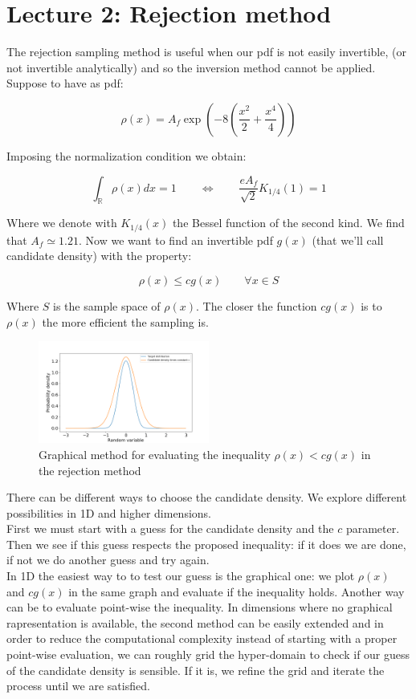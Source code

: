 \chapter*{Lecture 2: Rejection method}

The rejection sampling method is useful when our pdf is not easily invertible, (or not invertible analytically) and so the inversion method cannot be applied. \\
Suppose to have as pdf:

$$ \rho(x) = A_f \exp\left( -8 \left( \frac{x^2}{2}+\frac{x^4}{4} \right) \right) $$

Imposing the normalization condition we obtain:

$$ \int_{\mathbb{R}} \rho(x) dx = 1 \qquad \iff \qquad   \frac{eA_f}{\sqrt{2}}K_{1/4}(1) = 1$$

Where we denote with $K_{1/4}(x)$ the Bessel function of the second kind. 
We find that $A_f \simeq 1.21$.
Now we want to find an invertible pdf $g(x)$ (that we'll call candidate density) with the property:

$$ \rho(x) \leq c g(x) \qquad \forall x \in S $$

Where $S$ is the sample space of $\rho(x)$.
The closer the function $cg(x)$ is to $\rho(x)$ the more efficient the sampling is. \\

\begin{figure}
    \vspace{-25pt}
    \centering
    \includegraphics[width=0.5\textwidth]{FIG/exercise_2_images/rejection_sampling_inequality_check.png}
    \caption{Graphical method for evaluating the inequality $\rho(x)< cg(x)$ in the rejection method}
    \label{chapter2_rej_ineq}
\end{figure}


There can be different ways to choose the candidate density. We explore different possibilities in 1D and higher dimensions. \\
First we must start with a guess for the candidate density and the $c$ parameter. Then we see if this guess respects the proposed inequality: if it does we are done, if not we do another guess and try again. \\ 
In 1D the easiest way to to test our guess is the graphical one: we plot $\rho(x)$ and $cg(x)$ in the same graph and evaluate if the inequality holds. Another way can be to evaluate point-wise the inequality.
In dimensions where no graphical rapresentation is available, the second method can be easily extended and in order to reduce the computational complexity instead of starting with a proper point-wise evaluation, we can roughly grid the hyper-domain to check if our guess of the candidate density is sensible. If it is, we refine the grid and iterate the process until we are satisfied.

